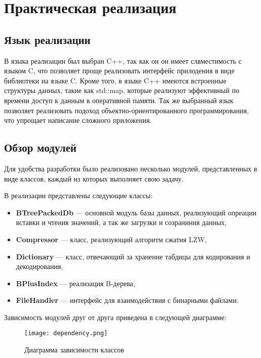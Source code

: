 \documentclass[14pt, russian]{scrartcl}
\begin{document}
\section{Практическая реализация}
\subsection{Язык реализации}
В языка реализации был выбран C++, так как он он имеет слвместимость с языком C, что позволяет проще реализовать интерфейс прилодения в виде библиотеки на языке C. Кроме того, в языке C++ имеются встроенные структуры данных, такие как std::map, которые реализуют эффективный по времени доступ к данным в оперативной памяти. Так же выбранный язык позволяет реализовать подоход объектно-ориентированного программирования, что упрощает написание сложного приложения.

\subsection{Обзор модулей}
Для удобства разработки было реализовано несколько модулей, представленных в виде классов, каждый из которых выполняет свою задачу.

В реализации представлены следующие классы:

\begin{itemize}
    \item \textbf{BTreePackedDb} --- основной модуль базы данных, реализующий опреации вставки и чтения значений, а так же загрузки и созраниния данных,
    \item \textbf{Compressor} --- класс, реализующий алгоритм сжатия LZW,
    \item \textbf{Dictionary} --- класс, отвечающий за хранение табдицы для кодирования и декодирования,
    \item \textbf{BPlusIndex} --- реализация B-дерева,
    \item \textbf{FileHandler} --- интерфейс для взаимодействия с бинарными файлами.
\end{itemize}

Зависимость модулей друг от друга приведена в следующей диаграмме:

\vspace{20pt}
\begin{figure}[H]\centering
\texttt{[image: dependency.png]}
\caption{Диаграмма зависимости классов}
\label{fig::thesis}
\end{figure}
\end{document}
